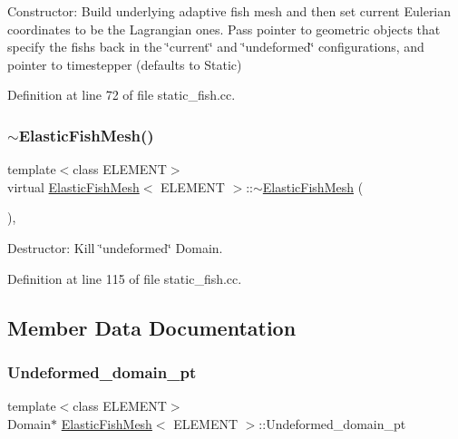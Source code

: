 Constructor\+: Build underlying adaptive fish mesh and then set current Eulerian coordinates to be the Lagrangian ones. Pass pointer to geometric objects that specify the fish\textquotesingle{}s back in the \char`\"{}current\char`\"{} and \char`\"{}undeformed\char`\"{} configurations, and pointer to timestepper (defaults to Static) 



Definition at line 72 of file static\+\_\+fish.\+cc.

\mbox{\label{classElasticFishMesh_ab8e084bb7551b9765b95dc38e82ab1be}} 
\subsubsection{\texorpdfstring{$\sim$\+Elastic\+Fish\+Mesh()}{~ElasticFishMesh()}}
{\footnotesize\ttfamily template$<$class E\+L\+E\+M\+E\+NT$>$ \\
virtual \hyperlink{classElasticFishMesh}{Elastic\+Fish\+Mesh}$<$ E\+L\+E\+M\+E\+NT $>$\+::$\sim$\hyperlink{classElasticFishMesh}{Elastic\+Fish\+Mesh} (\begin{DoxyParamCaption}{ }\end{DoxyParamCaption})\hspace{0.3cm}{\ttfamily [inline]}, {\ttfamily [virtual]}}



Destructor\+: Kill \char`\"{}undeformed\char`\"{} Domain. 



Definition at line 115 of file static\+\_\+fish.\+cc.



\subsection{Member Data Documentation}
\mbox{\label{classElasticFishMesh_aef83429a56e87c7218275c1da6c57087}} 
\subsubsection{\texorpdfstring{Undeformed\+\_\+domain\+\_\+pt}{Undeformed\_domain\_pt}}
{\footnotesize\ttfamily template$<$class E\+L\+E\+M\+E\+NT$>$ \\
Domain$\ast$ \hyperlink{classElasticFishMesh}{Elastic\+Fish\+Mesh}$<$ E\+L\+E\+M\+E\+NT $>$\+::Undeformed\+\_\+domain\+\_\+pt\hspace{0.3cm}{\ttfamily [private]}}

